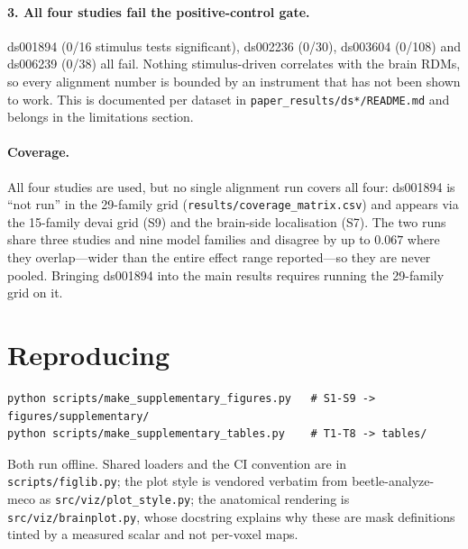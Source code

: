 \documentclass[11pt]{article}
\begin{document}
\paragraph{3. All four studies fail the positive-control gate.} ds001894
(0/16 stimulus tests significant), ds002236 (0/30), ds003604 (0/108) and
ds006239 (0/38) all fail. Nothing stimulus-driven correlates with the brain
RDMs, so every alignment number is bounded by an instrument that has not been
shown to work. This is documented per dataset in
\texttt{paper\_results/ds*/README.md} and belongs in the limitations section.

\paragraph{Coverage.} All four studies are used, but no single alignment run
covers all four: ds001894 is ``not run'' in the 29-family grid
(\texttt{results/coverage\_matrix.csv}) and appears via the 15-family devai
grid (S9) and the brain-side localisation (S7). The two runs share three
studies and nine model families and disagree by up to $0.067$ where they
overlap---wider than the entire effect range reported---so they are never
pooled. Bringing ds001894 into the main results requires running the
29-family grid on it.

\section{Reproducing}

\begin{verbatim}
python scripts/make_supplementary_figures.py   # S1-S9 -> figures/supplementary/
python scripts/make_supplementary_tables.py    # T1-T8 -> tables/
\end{verbatim}

Both run offline. Shared loaders and the CI convention are in
\texttt{scripts/figlib.py}; the plot style is vendored verbatim from
beetle-analyze-meco as \texttt{src/viz/plot\_style.py}; the anatomical
rendering is \texttt{src/viz/brainplot.py}, whose docstring explains why these
are mask definitions tinted by a measured scalar and not per-voxel maps.
\end{document}
